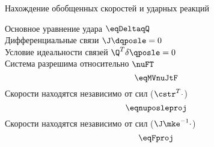 \begin{frame}{Нахождение обобщенных скоростей и ударных реакций}
    
    Основное уравнение удара  \quad \quad \quad \quad $ \eqDeltaqQ $ \\
    Дифференциальные связи  \quad \quad \quad \quad $ \J\dqposle = 0 $ \\
    Условие идеальности связей \quad \quad \quad $ \Q^T\delta\qposle = 0 $ \\

    Система разрешима относительно $\nuFT$
    $$ \eqMVnuJtF $$
    Скорости находятся независимо от сил ($\cstr^T\cdot$)    
    $$ \eqnuposleproj $$
    Скорости находятся независимо от сил ($\J\mke^{-1}\cdot$)    
    $$ \eqFproj $$
    
\end{frame}
